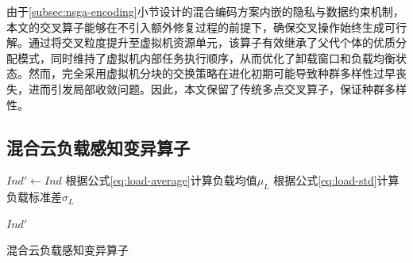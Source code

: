 
由于\ref{subsec:nsga-encoding}小节设计的混合编码方案内嵌的隐私与数据约束机制，本文的交叉算子能够在不引入额外修复过程的前提下，确保交叉操作始终生成可行解。通过将交叉粒度提升至虚拟机资源单元，该算子有效继承了父代个体的优质分配模式，同时维持了虚拟机内部任务执行顺序，从而优化了卸载窗口和负载均衡状态。然而，完全采用虚拟机分块的交换策略在进化初期可能导致种群多样性过早丧失，进而引发局部收敛问题。因此，本文保留了传统多点交叉算子，保证种群多样性。

\subsection{混合云负载感知变异算子}

\begin{algorithm}[htb!]
    \SetAlgoLined

    $Ind' \leftarrow Ind$ 
    根据公式\eqref{eq:load-average}计算负载均值$\mu_L$\;
    根据公式\eqref{eq:load-std}计算负载标准差$\sigma_L$\;



    \Return $Ind'$\;
    \caption{混合云负载感知变异算子}
    \label{alg:load-aware-mutation}
\end{algorithm}

